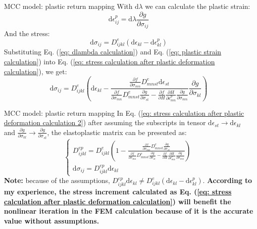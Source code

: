 \documentclass[aspectratio=169]{beamer}
\begin{document}
\begin{frame}{MCC model: plastic return mapping}
    With $\mathrm{d}\lambda$ we can calculate the plastic strain:
    \begin{equation}
        \mathrm{d} \epsilon_{ij}^p = \mathrm{d} \lambda \frac{\partial g}{\partial \sigma_{ij}}
        \label{eq: plastic strain calculation}
    \end{equation}
    And the stress: 
    \begin{equation}
        \mathrm{d} \sigma_{ij} = D^{e}_{ijkl}(\mathrm{d} \epsilon_{kl} - \mathrm{d} \epsilon_{kl}^p)
        \label{eq: stress calculation after plastic deformation calculation}
    \end{equation}
    Substituting Eq. (\ref{eq: dlambda calculation}) and Eq. (\ref{eq: plastic strain calculation}) into Eq. (\ref{eq: stress calculation after plastic deformation calculation}), we get:
    \begin{equation}
        \mathrm{d} \sigma_{ij} = D^{e}_{ijkl}(\mathrm{d} \epsilon_{kl} - \frac{\frac{\partial f}{\partial \sigma_{mn}} D^{e}_{mnst} \mathrm{d} \epsilon_{st} } {\frac{\partial f}{\partial \sigma_{mn}} D^{e}_{mnst} \frac{\partial g}{\partial \sigma_{st}} - \frac{\partial f}{\partial H}\frac{\partial H}{\partial \epsilon_{mn}^{p}}\frac{\partial g}{\partial \sigma_{mn}}} \frac{\partial g}{\partial \sigma_{kl}})
    \end{equation}  
    \label{eq: stress calculation after plastic deformation calculation 2}
\end{frame}

\begin{frame}{MCC model: plastic return mapping}
    In Eq. (\ref{eq: stress calculation after plastic deformation calculation 2}) after assuming the subscripts in tensor $\mathrm{d} \epsilon_{st} \rightarrow \mathrm{d} \epsilon_{kl}$ and $\frac{\partial g}{\partial \sigma_{kl}} \rightarrow \frac{\partial g}{\partial \sigma_{st}}$, the elastoplastic matrix can be presented as:
    \begin{equation}
        \left\{\begin{array}{l}
            D^{ep}_{ijkl} = D^{e}_{ijkl} \left(1- \frac{\frac{\partial f}{\partial \sigma_{mn}} D^{e}_{mnst} \frac{\partial g}{\partial \sigma_{st}} } {\frac{\partial f}{\partial \sigma_{mn}} D^{e}_{mnst} \frac{\partial g}{\partial \sigma_{st}} - \frac{\partial f}{\partial H}\frac{\partial H}{\partial \epsilon_{mn}^{p}}\frac{\partial g}{\partial \sigma_{mn}}}\right) \\
            \mathrm{d} \sigma_{ij} = D^{ep}_{ijkl}\mathrm{d} \epsilon_{kl}
        \end{array}\right.
        \label{eq: elastoplastic material matrix}
    \end{equation}
    \textbf{Note:} because of the assumptions, $D^{ep}_{ijkl}\mathrm{d}\epsilon_{kl} \neq D^{e}_{ijkl}\left(\mathrm{d}\epsilon_{kl} - \mathrm{d}\epsilon_{kl}^p \right)$. \textbf{According to my experience, the stress increment calculated as Eq. (\ref{eq: stress calculation after plastic deformation calculation}) will benefit the nonlinear iteration in the FEM calculation because of it is the accurate value without assumptions.}
\end{frame}
\end{document}
